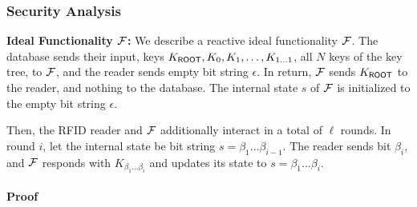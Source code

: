 \subsubsection{Security Analysis}
{\bf Ideal Functionality ${\mathcal{F}}$:}
We describe a reactive ideal functionality ${\mathcal{F}}$.  The database sends
their input, keys $K_{\mathsf{ROOT}},K_0,K_1,\ldots,K_{1\ldots{}1}$, all $N$
keys of the key tree, to ${\mathcal{F}}$, and the reader sends empty bit string
$\epsilon$. In return, ${\mathcal{F}}$ sends $K_{\mathsf{ROOT}}$ to the reader, and
nothing to the database.  The internal state $s$ of ${\mathcal{F}}$ is
initialized to the empty bit string $\epsilon$.

Then, the RFID reader and ${\mathcal{F}}$ additionally interact in a total of
$\ell$ rounds. In round $i$, let the internal state be bit string
$s=\beta_1\ldots{}\beta_{i-1}$. The reader sends bit $\beta_i$, and
${\mathcal{F}}$ responds with $K_{\beta_1\ldots\beta_{i}}$ and updates its
state to $s=\beta_1\ldots\beta_{i}$.


\paragraph{Proof}

